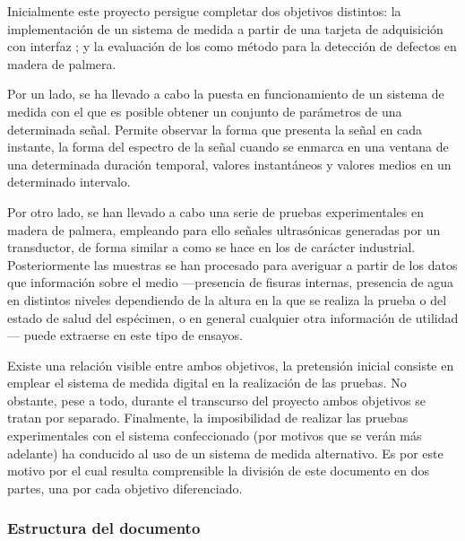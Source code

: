 Inicialmente este proyecto persigue completar dos objetivos distintos: la implementación de un sistema de medida a partir de una tarjeta de adquisición con interfaz ; y la evaluación de los  como método para la detección de defectos en madera de palmera.\par
Por un lado, se ha llevado a cabo la puesta en funcionamiento de un sistema de medida con el que es posible obtener un conjunto de parámetros de una determinada señal. Permite observar la forma que presenta la señal en cada instante, la forma del espectro de la señal cuando se enmarca en una ventana de una determinada duración temporal, valores instantáneos y valores medios en un determinado intervalo.\par
Por otro lado, se han llevado a cabo una serie de pruebas experimentales en madera de palmera, empleando para ello señales ultrasónicas generadas por un transductor, de forma similar a como se hace en los  de carácter industrial. Posteriormente las muestras se han procesado para averiguar a partir de los datos que información sobre el medio ---presencia de fisuras internas, presencia de agua en distintos niveles dependiendo de la altura en la que se realiza la prueba o del estado de salud del espécimen, o en general cualquier otra información de utilidad--- puede extraerse en este tipo de ensayos.\par
Existe una relación visible entre ambos objetivos, la pretensión inicial consiste en emplear el sistema de medida digital en la realización de las pruebas. No obstante, pese a todo, durante el transcurso del proyecto ambos objetivos se tratan por separado. Finalmente, la imposibilidad de realizar las pruebas experimentales con el sistema confeccionado (por motivos que se verán más adelante) ha conducido al uso de un sistema de medida alternativo. Es por este motivo por el cual resulta comprensible la división de este documento en dos partes, una por cada objetivo diferenciado.


\subsubsection{Estructura del documento}

